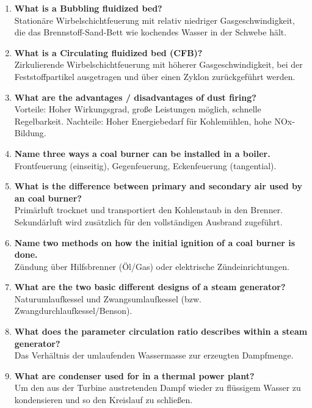 \documentclass{article}
\begin{document}
\begin{enumerate}
    Vorteile: Sehr robust, geringer Vorbereitungsaufwand für Brennstoff. Nachteile: Ungeeignet für Großkraftwerke, schlechtere Ausbrandrate.
    \item \textbf{What is a Bubbling fluidized bed?} \\
    Stationäre Wirbelschichtfeuerung mit relativ niedriger Gasgeschwindigkeit, die das Brennstoff-Sand-Bett wie kochendes Wasser in der Schwebe hält.
    \item \textbf{What is a Circulating fluidized bed (CFB)?} \\
    Zirkulierende Wirbelschichtfeuerung mit höherer Gasgeschwindigkeit, bei der Feststoffpartikel ausgetragen und über einen Zyklon zurückgeführt werden.
    \item \textbf{What are the advantages / disadvantages of dust firing?} \\
    Vorteile: Hoher Wirkungsgrad, große Leistungen möglich, schnelle Regelbarkeit. Nachteile: Hoher Energiebedarf für Kohlemühlen, hohe NOx-Bildung.
    \item \textbf{Name three ways a coal burner can be installed in a boiler.} \\
    Frontfeuerung (einseitig), Gegenfeuerung, Eckenfeuerung (tangential).
    \item \textbf{What is the difference between primary and secondary air used by an coal burner?} \\
    Primärluft trocknet und transportiert den Kohlenstaub in den Brenner. Sekundärluft wird zusätzlich für den vollständigen Ausbrand zugeführt.
    \item \textbf{Name two methods on how the initial ignition of a coal burner is done.} \\
    Zündung über Hilfsbrenner (Öl/Gas) oder elektrische Zündeinrichtungen.
    \item \textbf{What are the two basic different designs of a steam generator?} \\
    Naturumlaufkessel und Zwangsumlaufkessel (bzw. Zwangdurchlaufkessel/Benson).
    \item \textbf{What does the parameter circulation ratio describes within a steam generator?} \\
    Das Verhältnis der umlaufenden Wassermasse zur erzeugten Dampfmenge.
    \item \textbf{What are condenser used for in a thermal power plant?} \\
    Um den aus der Turbine austretenden Dampf wieder zu flüssigem Wasser zu kondensieren und so den Kreislauf zu schließen.

\end{enumerate}
\end{document}
